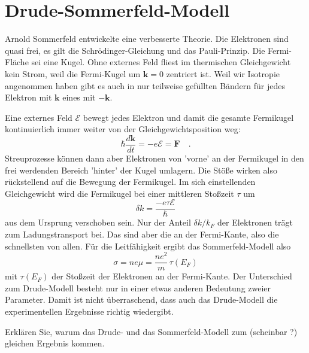 \section{Drude-Sommerfeld-Modell}

Arnold Sommerfeld entwickelte eine verbesserte Theorie. Die Elektronen sind quasi frei, es gilt die Schrödinger-Gleichung und das Pauli-Prinzip. Die Fermi-Fläche sei eine Kugel.
Ohne externes Feld fliest im thermischen Gleichgewicht kein Strom, weil die Fermi-Kugel um $\mathbf{k} = 0$ zentriert ist. Weil wir Isotropie angenommen haben gibt es auch in nur teilweise gefüllten Bändern für jedes Elektron mit $\mathbf{k}$ eines mit  $-\mathbf{k}$.

Eine externes Feld $\bm{\mathcal{E}}$ bewegt  jedes Elektron und damit die gesamte Fermikugel kontinuierlich immer weiter von der Gleichgewichtsposition weg:
\begin{equation}
   \hbar \frac{d \mathbf{k}}{dt} = -e \bm{\mathcal{E}} = \mathbf{F} \quad .
\end{equation}
Streuprozesse können dann aber Elektronen von 'vorne' an der Fermikugel in den frei werdenden Bereich 'hinter' der Kugel umlagern. Die Stöße wirken also rückstellend auf die Bewegung der Fermikugel. Im sich einstellenden Gleichgewicht wird die Fermikugel bei einer mittleren Stoßzeit $\tau$  um 
\begin{equation}
 \delta k = \frac{-e \tau \mathcal{E}}{\hbar}     
\end{equation}  
aus dem Ursprung verschoben sein. Nur der Anteil $\delta k / k_F$ der Elektronen trägt zum Ladungstransport bei. Das sind aber die an der Fermi-Kante, also die schnellsten von allen. Für die Leitfähigkeit ergibt das Sommerfeld-Modell also
\begin{equation}
   \sigma = n e \mu  = \frac{n e^2 }{m} \, \tau(E_F)
\end{equation}
mit $\tau(E_F)$ der Stoßzeit der Elektronen an der Fermi-Kante. Der Unterschied zum Drude-Modell besteht nur in einer etwas anderen Bedeutung zweier Parameter. Damit ist nicht überraschend, dass auch das Drude-Modell die experimentellen Ergebnisse richtig wiedergibt.

\begin{questions} 
    \item Erklären Sie, warum das Drude- und das Sommerfeld-Modell zum (scheinbar ?) gleichen Ergebnis kommen.
\end{questions}
    
